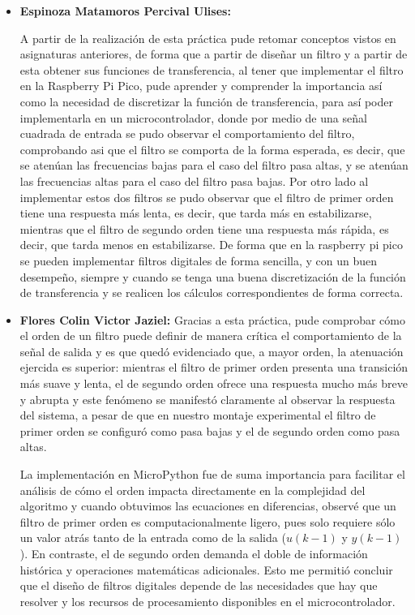 \documentclass[letterpaper,12pt]{article}
\begin{document}
    \begin{itemize}
        \item \textbf{Espinoza Matamoros Percival Ulises:}
        
        A partir de la realización de esta práctica pude retomar conceptos vistos en asignaturas anteriores, de forma que a partir de diseñar un filtro  y a partir de esta obtener sus funciones de transferencia, al tener que implementar el filtro en la Raspberry Pi Pico, pude aprender y comprender la importancia así como la necesidad de discretizar la función de transferencia, para así poder implementarla en un microcontrolador, donde por medio de una señal cuadrada de entrada se pudo observar el comportamiento del filtro, comprobando asi que el filtro se comporta de la forma esperada, es decir, que se atenúan las frecuencias bajas para el caso del filtro pasa altas, y se atenúan las frecuencias altas para el caso del filtro pasa bajas. Por otro lado al implementar estos dos filtros se pudo observar que el filtro de primer orden tiene una respuesta más lenta, es decir, que tarda más en estabilizarse, mientras que el filtro de segundo orden tiene una respuesta más rápida, es decir, que tarda menos en estabilizarse. De forma que en la raspberry pi pico se pueden implementar filtros digitales de forma sencilla, y con un buen desempeño, siempre y cuando se tenga una buena discretización de la función de transferencia y se realicen los cálculos correspondientes de forma correcta.
        
        \item \textbf{Flores Colin Victor Jaziel:}
        Gracias a esta práctica, pude comprobar cómo el orden de un filtro puede definir de manera crítica el comportamiento de la señal de salida y es que quedó evidenciado que, a mayor orden, la atenuación ejercida es superior: mientras el filtro de primer orden presenta una transición más suave y lenta, el de segundo orden ofrece una respuesta mucho más breve y abrupta y este fenómeno se manifestó claramente al observar la respuesta del sistema, a pesar de que en nuestro montaje experimental el filtro de primer orden se configuró como pasa bajas y el de segundo orden como pasa altas.
        
        La implementación en MicroPython fue de suma importancia para facilitar el análisis de cómo el orden impacta directamente en la complejidad del algoritmo y cuando obtuvimos las ecuaciones en diferencias, observé que un filtro de primer orden es computacionalmente ligero, pues solo requiere sólo un valor atrás tanto de la entrada como de la salida ($u(k-1)$ y $y(k-1)$). En contraste, el de segundo orden demanda el doble de información histórica y operaciones matemáticas adicionales. Esto me permitió concluir que el diseño de filtros digitales depende de las necesidades que hay que resolver y los recursos de procesamiento disponibles en el microcontrolador.



\end{itemize}
\end{document}
